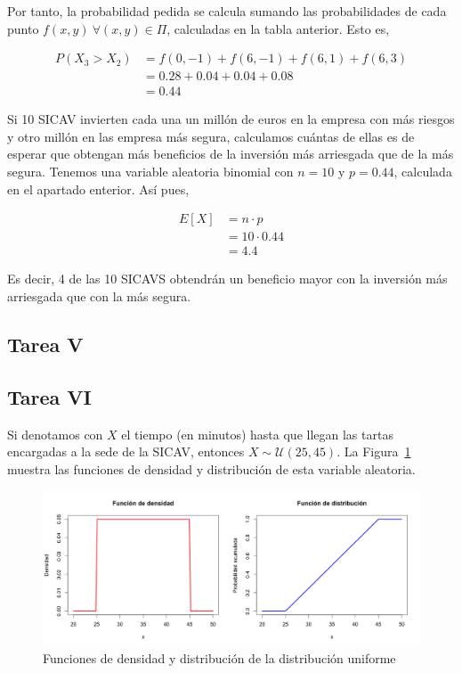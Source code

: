 \documentclass[12pt,a4paper,twoside,openright,titlepage,final]{article}
\begin{document}
Por tanto, la probabilidad pedida se calcula sumando las probabilidades de cada punto $f(x,y) \ \forall (x,y) \in \Pi$, calculadas en la tabla anterior. Esto es,

\begin{align*}
P(X_3 > X_2) & = f(0,-1) + f(6, -1) + f(6,1) + f(6,3) \\
& = 0.28 + 0.04 + 0.04 + 0.08 \\
& = 0.44
\end{align*} 

Si 10 SICAV invierten cada una un millón de euros en la empresa con más riesgos y otro millón en las empresa más segura, calculamos cuántas de ellas es de esperar que obtengan más beneficios de la inversión más arriesgada que de la más segura. Tenemos una variable aleatoria binomial con $n =10$ y $p = 0.44$, calculada en el apartado enterior. Así pues,

\begin{align*}
E[X] & = n \cdot p \\
& = 10 \cdot 0.44 \\
& = 4.4 
\end{align*}

Es decir, 4 de las 10 SICAVS obtendrán un beneficio mayor con la inversión más arriesgada que con la más segura.

\subsection{Tarea V}



\subsection{Tarea VI}

Si denotamos con $X$ el tiempo (en minutos) hasta que llegan las tartas encargadas a la sede de la SICAV, entonces $X \sim \mathcal{U}(25,45)$. La Figura~\ref{fig:funcion_distribucion_uniforme} muestra las funciones de densidad y distribución de esta variable aleatoria.\\

\begin{figure}[tbph!]
\centering
\includegraphics[width=0.9\linewidth]{imagenes/funcion_distribucion_uniforme}
\caption{Funciones de densidad y distribución de la distribución uniforme}
\label{fig:funcion_distribucion_uniforme}
\end{figure}
\end{document}

